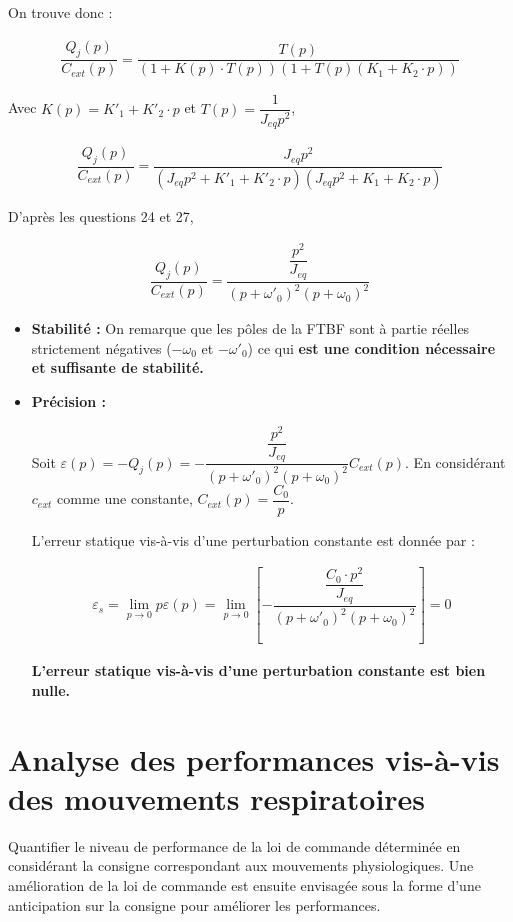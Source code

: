 \documentclass[10pt,fleqn]{article} %
\begin{document}
On trouve donc : 

\begin{align*}
\dfrac{Q_j(p)}{C_{ext}(p)}=\dfrac{T(p)}{\left(1+K(p)\cdot T(p)\right)\left(1+T(p)\left(K_1+K_2\cdot p\right)\right)}
\end{align*}

Avec $K(p)=K'_1+K'_2\cdot p$ et $T(p)=\dfrac{1}{J_{eq}p^2}$,


\begin{align*}
\dfrac{Q_j(p)}{C_{ext}(p)}=\dfrac{J_{eq}p^2}{\left(J_{eq}p^2+K'_1+K'_2\cdot p\right)\left(J_{eq}p^2+K_1+K_2\cdot p\right)}
\end{align*}

D'après les questions 24 et 27,

\begin{align*}
\dfrac{Q_j(p)}{C_{ext}(p)}=\dfrac{\dfrac{p^2}{J_{eq}}}{\left(p+\omega'_0\right)^2\left(p+\omega_0\right)^2}
\end{align*}




\begin{itemize}
\item \textbf{Stabilité : } On remarque que les pôles de la FTBF sont à partie réelles strictement négatives ($-\omega_0$ et $-\omega'_0$) ce qui \textbf{est une condition nécessaire et suffisante de stabilité.}
\item \textbf{Précision : }

Soit $\varepsilon(p)=-Q_j(p)=-\dfrac{\dfrac{p^2}{J_{eq}}}{\left(p+\omega'_0\right)^2\left(p+\omega_0\right)^2}C_{ext}(p)$. En considérant $c_{ext}$ comme une constante, $C_{ext}(p)=\dfrac{C_0}{p}$.

L'erreur statique vis-à-vis d'une perturbation constante est donnée par :

\begin{align*}
\varepsilon_s= \lim_{p\rightarrow0} p\varepsilon(p)= \lim_{p\rightarrow0}\left[-\dfrac{\dfrac{C_0\cdot p^2}{J_{eq}}}{\left(p+\omega'_0\right)^2\left(p+\omega_0\right)^2}\right]=0
\end{align*} 

\textbf{L'erreur statique vis-à-vis d'une perturbation constante est bien nulle.}
\end{itemize}





\section{Analyse des performances vis-à-vis des mouvements respiratoires}
\begin{obj}
Quantifier le niveau de performance de la loi de commande déterminée en considérant la consigne
correspondant aux mouvements physiologiques. Une amélioration de la loi de commande est ensuite
envisagée sous la forme d’une anticipation sur la consigne pour améliorer les performances.
\end{obj}
\end{document}
